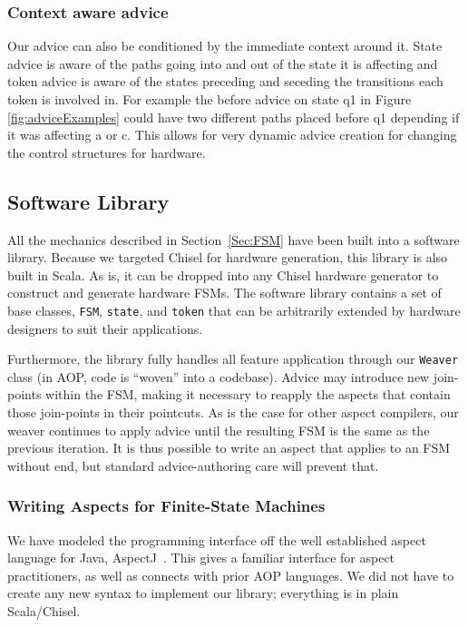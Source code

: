 \documentclass[conference]{IEEEtran}
\begin{document}
\subsubsection{Context aware advice} 
Our advice can also be conditioned by the immediate context around it. State advice is aware of the paths going into and out of the state it is affecting and token advice is aware of the states preceding and seceding the transitions each token is involved in. For example the before advice on state q1 in Figure \ref{fig:adviceExamples} could have two different paths placed before q1 depending if it was affecting a or c. This allows for very dynamic advice creation for changing the control structures for hardware.

\subsection{Software Library}\label{sec:foam}
All the mechanics described in Section~\ref{Sec:FSM} have been built into a software library. Because we targeted Chisel for hardware generation, this library is also built in Scala. As is, it can be dropped into any Chisel hardware generator to construct and generate hardware FSMs. The software library contains a set of base classes, \texttt{FSM}, \texttt{state}, and \texttt{token} that can be arbitrarily extended by hardware designers to suit their applications. 

Furthermore, the library fully handles all feature application through our \texttt{Weaver} class (in AOP, code is ``woven'' into a codebase). Advice may introduce new join-points within the FSM, making it necessary to reapply the aspects that contain those join-points in their pointcuts. As is the case for other aspect compilers, our weaver continues to apply advice until the resulting FSM is the same as the previous iteration.  It is thus possible to write an aspect that applies to an FSM without end, but standard advice-authoring care will prevent that.

\subsubsection{Writing Aspects for Finite-State Machines}
We have modeled the programming interface off the well established aspect language for Java, AspectJ~\cite{AspectJ:01}. This gives a familiar interface for aspect practitioners, as well as connects with prior AOP languages. We did not have to create any new syntax to implement our library; everything is in plain Scala/Chisel.
\end{document}
